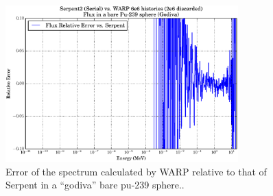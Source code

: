 \begin{figure}[h!] 
\centering
\includegraphics[width=0.8\textwidth]{graphics/finalresults/godiva_spec_err.eps}
\caption{Error of the spectrum calculated by WARP relative to that of Serpent in a ``godiva'' bare pu-239 sphere.. \label{godiva_spec_err} }
\end{figure}

